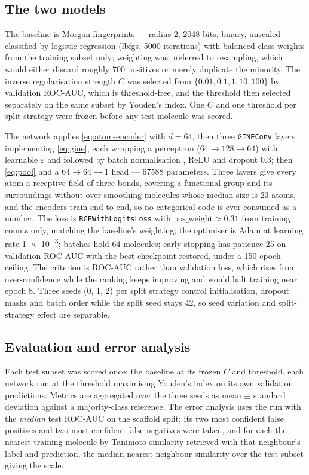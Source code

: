 \subsection{The two models}

The baseline is Morgan fingerprints --- radius 2, 2048 bits, binary, unscaled --- classified by logistic regression (lbfgs, \num{5000} iterations) with balanced class weights from the training subset only; weighting was preferred to resampling, which would either discard roughly 700 positives or merely duplicate the minority. The inverse regularisation strength $C$ was selected from $\{0.01, 0.1, 1, 10, 100\}$ by validation ROC-AUC, which is threshold-free, and the threshold then selected separately on the same subset by Youden's index. One $C$ and one threshold per split strategy were frozen before any test molecule was scored.

The network applies \cref{eq:atom-encoder} with $d = 64$, then three \texttt{GINEConv} layers implementing \cref{eq:gine}, each wrapping a perceptron ($64 \to 128 \to 64$) with learnable $\varepsilon$ and followed by batch normalisation \parencite{BatchNorm}, ReLU and dropout $0.3$; then \cref{eq:pool} and a $64 \to 64 \to 1$ head --- \num{67588} parameters. Three layers give every atom a receptive field of three bonds, covering a functional group and its surroundings without over-smoothing molecules whose median size is 23 atoms, and the encoders train end to end, so no categorical code is ever consumed as a number. The loss is \texttt{BCEWithLogitsLoss} with $\text{pos\_weight} \approx 0.31$ from training counts only, matching the baseline's weighting; the optimiser is Adam \parencite{Adam} at learning rate \num{1e-3}; batches hold 64 molecules; early stopping has patience 25 on validation ROC-AUC with the best checkpoint restored, under a 150-epoch ceiling. The criterion is ROC-AUC rather than validation loss, which rises from over-confidence while the ranking keeps improving and would halt training near epoch 8. Three seeds (0, 1, 2) per split strategy control initialisation, dropout masks and batch order while the split seed stays 42, so seed variation and split-strategy effect are separable.

\subsection{Evaluation and error analysis}

Each test subset was scored once: the baseline at its frozen $C$ and threshold, each network run at the threshold maximising Youden's index on its own validation predictions. Metrics are aggregated over the three seeds as mean $\pm$ standard deviation against a majority-class reference. The error analysis uses the run with the \emph{median} test ROC-AUC on the scaffold split; its two most confident false positives and two most confident false negatives were taken, and for each the nearest training molecule by Tanimoto similarity retrieved with that neighbour's label and prediction, the median nearest-neighbour similarity over the test subset giving the scale.
